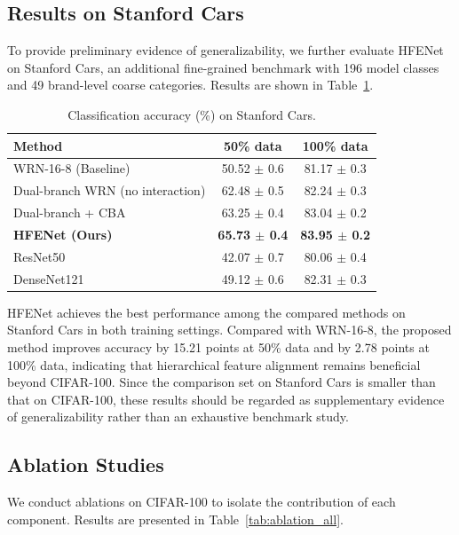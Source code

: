 \documentclass[pdflatex,sn-mathphys-num]{sn-jnl}
\theoremstyle{thmstyleone}%
\theoremstyle{thmstyletwo}%
\theoremstyle{thmstylethree}%
\begin{document}
\subsection{Results on Stanford Cars}
To provide preliminary evidence of generalizability, we further evaluate HFENet on Stanford Cars, an additional fine-grained benchmark with 196 model classes and 49 brand-level coarse categories. Results are shown in Table~\ref{tab:cars_results}.
\begin{table}[htbp]
    \centering
    \caption{Classification accuracy (\%) on Stanford Cars.}
    \label{tab:cars_results}
    \begin{tabular}{@{}lcc@{}}
    \toprule
    \textbf{Method} & \textbf{50\% data} & \textbf{100\% data} \\
    \midrule
    WRN-16-8 (Baseline) & 50.52 $\pm$ 0.6 & 81.17 $\pm$ 0.3 \\
    Dual-branch WRN (no interaction) & 62.48 $\pm$ 0.5 & 82.24 $\pm$ 0.3 \\
    Dual-branch + CBA & 63.25 $\pm$ 0.4 & 83.04 $\pm$ 0.2 \\
    \textbf{HFENet (Ours)} & \textbf{65.73 $\pm$ 0.4} & \textbf{83.95 $\pm$ 0.2} \\
    \midrule
    ResNet50 & 42.07 $\pm$ 0.7 & 80.06 $\pm$ 0.4 \\
    DenseNet121 & 49.12 $\pm$ 0.6 & 82.31 $\pm$ 0.3 \\
    \bottomrule
    \end{tabular}
\end{table}
HFENet achieves the best performance among the compared methods on Stanford Cars in both training settings. 
Compared with WRN-16-8, the proposed method improves accuracy by 15.21 points at 50\% data and by 2.78 points at 100\% data, indicating that hierarchical feature alignment remains beneficial beyond CIFAR-100. 
Since the comparison set on Stanford Cars is smaller than that on CIFAR-100, these results should be regarded as supplementary evidence of generalizability rather than an exhaustive benchmark study.

\subsection{Ablation Studies}
We conduct ablations on CIFAR-100 to isolate the contribution of each component. Results are presented in Table~\ref{tab:ablation_all}.
\end{document}
